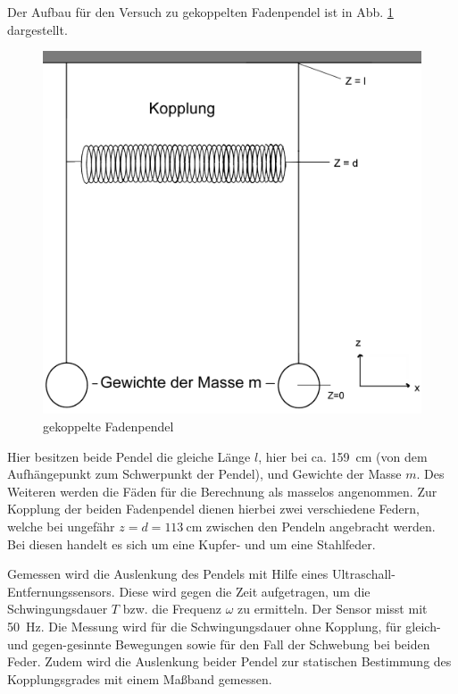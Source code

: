 \documentclass[11pt,a4paper,titlepage, ngerman]{article}
\newcommand{\refabb}[1]{Abb. \ref{abb:#1}}
\begin{document}
			Der Aufbau für den Versuch zu gekoppelten Fadenpendel ist in \refabb{gFadenpendel} dargestellt. 
			\begin{figure}[ht]
				\centering
				\includegraphics[width=\textwidth]{gFadenpendel.png}
				\caption{gekoppelte Fadenpendel}
				\label{abb:gFadenpendel}	
			\end{figure}
			Hier besitzen beide Pendel die gleiche Länge $l$, hier bei ca. \SI{159}{\cm} (von dem Aufhängepunkt zum Schwerpunkt der Pendel), und Gewichte der Masse $m$. Des Weiteren werden die Fäden für die Berechnung als masselos angenommen. Zur Kopplung der beiden Fadenpendel dienen hierbei zwei verschiedene Federn, welche bei ungefähr $z=d=\SI{113}{\cm}$ zwischen den Pendeln angebracht werden. Bei diesen handelt es sich um eine Kupfer- und um eine Stahlfeder.
			
			Gemessen wird die Auslenkung des Pendels mit Hilfe eines Ultraschall-Entfernungssensors. Diese wird gegen die Zeit aufgetragen, um die Schwingungsdauer $T$ bzw. die Frequenz $\omega$ zu ermitteln. Der Sensor misst mit \SI{50}{\Hz}. Die Messung wird für die Schwingungsdauer ohne Kopplung, für gleich- und gegen-gesinnte Bewegungen sowie für den Fall der Schwebung bei beiden Feder.
			Zudem wird die Auslenkung beider Pendel zur statischen Bestimmung des Kopplungsgrades mit einem Maßband gemessen. 
\end{document}
